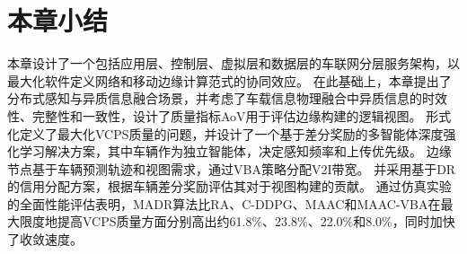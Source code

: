 \section{本章小结}\label{section 2-7}

本章设计了一个包括应用层、控制层、虚拟层和数据层的车联网分层服务架构，以最大化软件定义网络和移动边缘计算范式的协同效应。
在此基础上，本章提出了分布式感知与异质信息融合场景，并考虑了车载信息物理融合中异质信息的时效性、完整性和一致性，设计了质量指标AoV用于评估边缘构建的逻辑视图。
形式化定义了最大化VCPS质量的问题，并设计了一个基于差分奖励的多智能体深度强化学习解决方案，其中车辆作为独立智能体，决定感知频率和上传优先级。
边缘节点基于车辆预测轨迹和视图需求，通过VBA策略分配V2I带宽。
并采用基于DR的信用分配方案，根据车辆差分奖励评估其对于视图构建的贡献。
通过仿真实验的全面性能评估表明，MADR算法比RA、C-DDPG、MAAC和MAAC-VBA在最大限度地提高VCPS质量方面分别高出约61.8\%、23.8\%、22.0\%和8.0\%，同时加快了收敛速度。